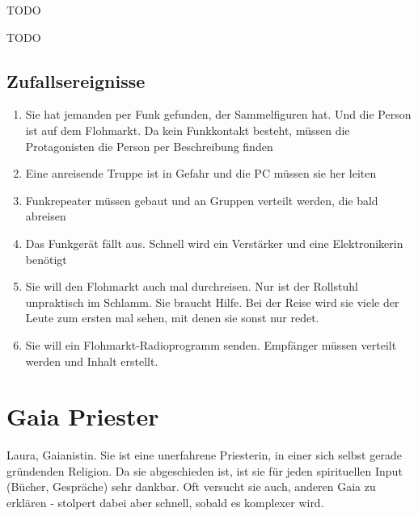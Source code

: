 \begin{npcBox}[title=Antigone]
    \begin{consequences}
    \item {}
    \item {}
    \item {}
    \end{consequences}

    \begin{npcDescription}
    TODO
    \end{npcDescription}


    \begin{equipment}
    \item TODO
    \end{equipment}
\end{npcBox}

\subsection{Zufallsereignisse}

\begin{enumerate}
\item Sie hat jemanden per Funk gefunden, der Sammelfiguren hat. Und die Person ist auf dem Flohmarkt. Da kein Funkkontakt besteht, müssen die Protagonisten die Person per Beschreibung finden
\item Eine anreisende Truppe ist in Gefahr und die PC müssen sie her leiten
\item Funkrepeater müssen gebaut und an Gruppen verteilt werden, die bald abreisen
\item Das Funkgerät fällt aus. Schnell wird ein Verstärker und eine Elektronikerin benötigt
\item Sie will den Flohmarkt auch mal durchreisen. Nur ist der Rollstuhl unpraktisch im Schlamm. Sie braucht Hilfe. Bei der Reise wird sie viele der Leute zum ersten mal sehen, mit denen sie sonst nur redet.
\item Sie will ein Flohmarkt-Radioprogramm senden. Empfänger müssen verteilt werden und Inhalt erstellt.
\end{enumerate}

\newpage

\section{Gaia Priester}

Laura, Gaianistin. Sie ist eine unerfahrene Priesterin, in einer sich selbst gerade gründenden Religion. Da sie abgeschieden ist, ist sie für jeden spirituellen Input (Bücher, Gespräche) sehr dankbar. Oft versucht sie auch, anderen Gaia zu erklären - stolpert dabei aber schnell, sobald es komplexer wird.


